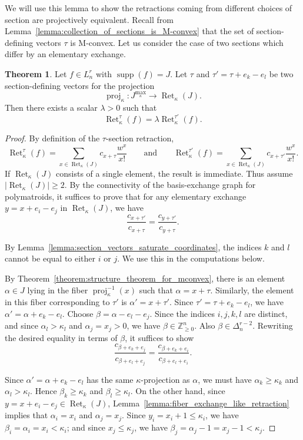 \documentclass[11pt]{article}
\theoremstyle{definition}
\newtheorem{theorem}{Theorem}[section]
\theoremstyle{remark}
\newcommand{\Zgeqn}{\mathbb{Z}_{\geq 0}^n}     %
\DeclareMathOperator{\supp}{supp}
\newcommand{\Lnr}{L_n^r}
\DeclareMathOperator{\proj}{proj}              %
\newcommand{\kproj}{\proj_{\kappa}}            %
\DeclareMathOperator{\Ret}{Ret}                %
\newcommand{\RetK}{\Ret_{\kappa}}              %
\newcommand{\Jmax}{J^{\max_{\kappa}}}
\begin{document}
We will use this lemma to show the retractions coming from different choices of section are projectively equivalent. Recall from Lemma~\ref{lemma:collection_of_sections_is_M-convex} that the set of section-defining vectors $\tau$ is M-convex. Let us consider the case of two sections which differ by an elementary exchange.

\begin{theorem}\label{theorem:projective_eq_of_lorentzian_sections}
    Let $f\in\Lnr$ with $\supp(f)=J$. Let $\tau$ and $\tau'=\tau+e_k-e_l$ be two section-defining vectors for the projection
    \[
        \kproj\colon \Jmax\to\RetK(J).
    \]
    Then there exists a scalar $\lambda>0$ such that
    \[
        \RetK^\tau(f)=\lambda\RetK^{\tau'}(f).
    \]
\end{theorem}
\begin{proof}
    By definition of the $\tau$-section retraction,
    \[
        \RetK^\tau(f)
        =
        \sum_{x\in\RetK(J)}
        c_{x+\tau}\frac{w^x}{x!}
        \qquad\text{and}\qquad
        \RetK^{\tau'}(f)
        =
        \sum_{x\in\RetK(J)}
        c_{x+\tau'}\frac{w^x}{x!}.
    \]
    If $\RetK(J)$ consists of a single element, the result is immediate. Thus assume $|\RetK(J)|\geq 2$. By the connectivity of the basis-exchange graph for polymatroids, it suffices to prove that for any elementary exchange $y=x+e_i-e_j$ in $\RetK(J)$, we have
    \[
        \frac{c_{x+\tau'}}{c_{x+\tau}}
        =
        \frac{c_{y+\tau'}}{c_{y+\tau}}.
    \]

    By Lemma~\ref{lemma:section_vectors_saturate_coordinates}, the indices $k$ and $l$ cannot be equal to either $i$ or $j$. We use this in the computations below.

    By Theorem~\ref{theorem:structure_theorem_for_mconvex}, there is an element $\alpha\in J$ lying in the fiber $\kproj^{-1}(x)$ such that $\alpha=x+\tau$. Similarly, the element in this fiber corresponding to $\tau'$ is $\alpha'=x+\tau'$. Since $\tau'=\tau+e_k-e_l$, we have $\alpha'=\alpha+e_k-e_l$. Choose $\beta=\alpha-e_l-e_j$. Since the indices $i,j,k,l$ are distinct, and since $\alpha_l>\kappa_l$ and $\alpha_j=x_j>0$, we have $\beta\in\Zgeqn$. Also $\beta\in\Delta_n^{r-2}$. Rewriting the desired equality in terms of $\beta$, it suffices to show
    \[
        \frac{c_{\beta+e_k+e_j}}{c_{\beta+e_l+e_j}}
        =
        \frac{c_{\beta+e_k+e_i}}{c_{\beta+e_l+e_i}}.
    \]

    Since $\alpha'=\alpha+e_k-e_l$ has the same $\kappa$-projection as $\alpha$, we must have $\alpha_k\geq\kappa_k$ and $\alpha_l>\kappa_l$. Hence $\beta_k\geq\kappa_k$ and $\beta_l\geq\kappa_l$. On the other hand, since $y=x+e_i-e_j\in\RetK(J)$, Lemma~\ref{lemma:fiber_exchange_like_retraction} implies that $\alpha_i=x_i$ and $\alpha_j=x_j$. Since $y_i=x_i+1\leq\kappa_i$, we have $\beta_i=\alpha_i=x_i<\kappa_i$; and since $x_j\leq\kappa_j$, we have $\beta_j=\alpha_j-1=x_j-1<\kappa_j$.


\end{proof}
\end{document}
